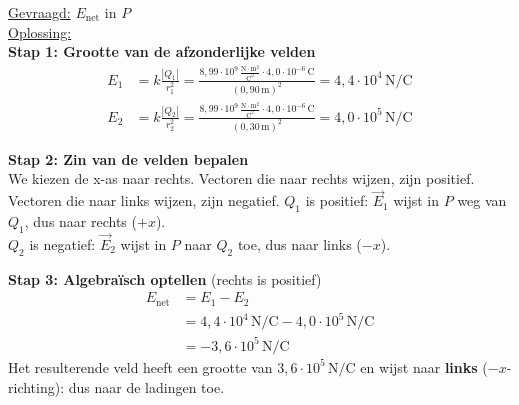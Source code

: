 \documentclass{ximera}
\begin{document}
\begin{exercise}
\begin{solution}
        \underline{Gevraagd:} $E_{\text{net}}$ in $P$\\

        \underline{Oplossing:}\\
        \textbf{Stap 1: Grootte van de afzonderlijke velden}
        \begin{align*}
            E_{1} &= k \frac{|Q_{1}|}{r_{1}^{2}} = \frac{8{,}99 \cdot 10^{9} \, \mathrm{\frac{N \cdot m^2}{C^2}} \cdot 4{,}0 \cdot 10^{-6} \, \mathrm{C}}{(0{,}90 \, \mathrm{m})^{2}} = 4{,}4 \cdot 10^{4} \, \mathrm{N/C} \\
            E_{2} &= k \frac{|Q_{2}|}{r_{2}^{2}} = \frac{8{,}99 \cdot 10^{9} \, \mathrm{\frac{N \cdot m^2}{C^2}} \cdot 4{,}0 \cdot 10^{-6} \, \mathrm{C}}{(0{,}30 \, \mathrm{m})^{2}} = 4{,}0 \cdot 10^{5} \, \mathrm{N/C}
        \end{align*}

        \textbf{Stap 2: Zin van de velden bepalen}\\
        We kiezen de x-as naar rechts. Vectoren die naar rechts wijzen, zijn positief. Vectoren die naar links wijzen, zijn negatief.
        $Q_1$ is positief: $\vec{E}_1$ wijst in $P$ weg van $Q_1$, dus naar rechts ($+x$).\\
        $Q_2$ is negatief: $\vec{E}_2$ wijst in $P$ naar $Q_2$ toe, dus naar links ($-x$).

        \textbf{Stap 3: Algebraïsch optellen} (rechts is positief)
        \begin{align*}
            E_{\text{net}} &= E_1 - E_2 \\
                            &= 4{,}4 \cdot 10^{4} \, \mathrm{N/C} - 4{,}0 \cdot 10^{5} \, \mathrm{N/C} \\
                            &= \boxed{-3{,}6 \cdot 10^{5} \, \mathrm{N/C}}
        \end{align*}
        Het resulterende veld heeft een grootte van $3{,}6 \cdot 10^{5} \, \mathrm{N/C}$ en wijst naar \textbf{links} ($-x$-richting): dus naar de ladingen toe.
    \end{solution}
\end{exercise}
\end{document}
